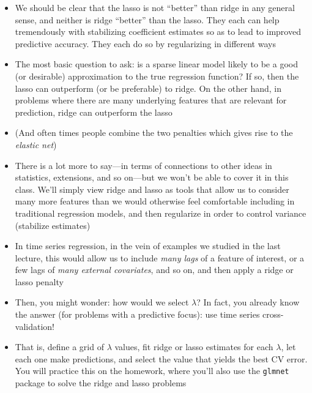 \documentclass{article}
\begin{document}
\begin{itemize}
\item We should be clear that the lasso is not ``better'' than ridge in any
  general sense, and neither is ridge ``better'' than the lasso. They each can
  help tremendously with stabilizing coefficient estimates so as to lead to
  improved predictive accuracy. They each do so by regularizing in different
  ways 

\item The most basic question to ask: is a sparse linear model likely
  to be a good (or desirable) approximation to the true regression function? If
  so, then the lasso can outperform (or be preferable) to ridge. On the other 
  hand, in problems where there are many underlying features that are relevant
  for prediction, ridge can outperform the lasso 

\item (And often times people combine the two penalties which gives rise to the
  \emph{elastic net}) 

\item There is a lot more to say---in terms of connections to other ideas in
  statistics, extensions, and so on---but we won't be able to cover it in this
  class. We'll simply view ridge and lasso as tools that allow us to consider 
  many more features than we would otherwise feel comfortable including in
  traditional regression models, and then regularize in order to control
  variance (stabilize estimates)   

\item In time series regression, in the vein of examples we studied in the last 
  lecture, this would allow us to include \emph{many lags} of a feature of
  interest, or a few lags of \emph{many external covariates}, and so on, and
  then apply a ridge or lasso penalty

\item Then, you might wonder: how would we select $\lambda$? In fact, you
  already know the answer (for problems with a predictive focus): use time
  series cross-validation! 

\item That is, define a grid of $\lambda$ values, fit ridge or lasso estimates
  for each $\lambda$, let each one make predictions, and select the value that 
  yields the best CV error. You will practice this on the homework, where you'll
  also use the \verb|glmnet| package to solve the ridge and lasso problems 
\end{itemize}
\end{document}
